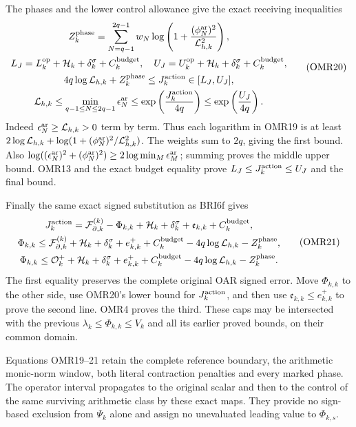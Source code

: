 \documentclass[11pt,a4paper]{article}
\begin{document}
The phases and the lower control allowance give the exact receiving
inequalities
\[
 \begin{gathered}
 Z_k^{\rm phase}=\sum_{N=q-1}^{2q-1}w_N
       \log\left(1+\frac{(\phi_N^{\rm ar})^2}{\mathcal L_{h,k}^2}\right),\\
 L_J=L_k^{\rm op}+\mathcal H_k+\delta_k^\sigma+C_k^{\rm budget},\quad
 U_J=U_k^{\rm op}+\mathcal H_k+\delta_k^\sigma+C_k^{\rm budget},\\
 4q\log\mathcal L_{h,k}+Z_k^{\rm phase}
       \le J_k^{\rm action}\in[L_J,U_J],\\
 \mathcal L_{h,k}\le\min_{q-1\le N\le2q-1}\epsilon_N^{\rm ar}
       \le\exp\left(\frac{J_k^{\rm action}}{4q}\right)
       \le\exp\left(\frac{U_J}{4q}\right).
 \end{gathered}\tag{OMR20}
\]
Indeed $\epsilon_N^{\rm ar}\ge\mathcal L_{h,k}>0$ term by term.
Thus each logarithm in OMR19 is at least
$2\log\mathcal L_{h,k}+
\log(1+(\phi_N^{\rm ar})^2/\mathcal L_{h,k}^2)$.
The weights sum to $2q$, giving the first bound.
Also $\log((\epsilon_N^{\rm ar})^2+(\phi_N^{\rm ar})^2)
\ge2\log\min_M\epsilon_M^{\rm ar}$; summing proves the
middle upper bound. OMR13 and the exact budget equality prove
$L_J\le J_k^{\rm action}\le U_J$ and the final bound.

Finally the same exact signed substitution as BRI6f gives
\[
 \begin{gathered}
 J_k^{\rm action}
 =\mathcal F_{\partial,k}^{(k)}-\Phi_{k,k}
       +\mathcal H_k+\delta_k^\sigma+\mathfrak e_{k,k}
       +C_k^{\rm budget},\\
 \Phi_{k,k}\le
 \mathcal F_{\partial,k}^{(k)}+\mathcal H_k+\delta_k^\sigma
       +e_{k,k}^++C_k^{\rm budget}
       -4q\log\mathcal L_{h,k}-Z_k^{\rm phase},\\
 \Phi_{k,k}\le
 \mathcal O_k^++\mathcal H_k+\delta_k^\sigma
       +e_{k,k}^++C_k^{\rm budget}
       -4q\log\mathcal L_{h,k}-Z_k^{\rm phase}.
 \end{gathered}\tag{OMR21}
\]
The first equality preserves the complete original OAR signed
error. Move $\Phi_{k,k}$ to the other side, use OMR20's lower
bound for $J_k^{\rm action}$, and then use
$\mathfrak e_{k,k}\le e_{k,k}^+$ to prove the second line.
OMR4 proves the third. These caps may be intersected with the
previous $\lambda_k\le\Phi_{k,k}\le V_k$ and all its earlier
proved bounds, on their common domain.

Equations OMR19--21 retain the complete reference boundary, the
arithmetic monic-norm window, both literal contraction penalties
and every marked phase. The operator interval propagates to the
original scalar and then to the control of the same surviving
arithmetic class by these exact maps. They provide no sign-based
exclusion from $\Psi_k$ alone and assign no unevaluated leading
value to $\Phi_{k,s}$.
\end{document}

